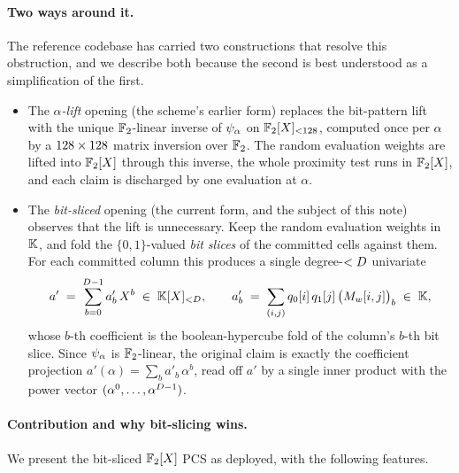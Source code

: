 \paragraph{Two ways around it.} The reference codebase has carried two
constructions that resolve this obstruction, and we describe both
because the second is best understood as a simplification of the first.

\begin{itemize}[leftmargin=2em]
  \item The \emph{$\alpha$-lift} opening (the scheme's earlier form)
    replaces the bit-pattern lift with the unique $\mathbb{F}_2$-linear inverse
    of $\psi_{\alpha}$ on $\mathbb{F}_2[X]_{<128}$, computed once per $\alpha$
    by a $128 \times 128$ matrix inversion over $\mathbb{F}_2$. The
    random evaluation weights are lifted into $\mathbb{F}_2[X]$ through this
    inverse, the whole proximity test runs in $\mathbb{F}_2[X]$, and each claim
    is discharged by one evaluation at $\alpha$.

  \item The \emph{bit-sliced} opening (the current form, and the subject
    of this note) observes that the lift is unnecessary. Keep the random
    evaluation weights in $\mathbb{K}$, and fold the $\{0,1\}$-valued
    \emph{bit slices} of the committed cells against them. For each
    committed column this produces a single degree-$<D$ univariate
    \[
      a' \;=\; \sum_{b=0}^{D-1} a'_b \, X^b \;\in\; \mathbb{K}[X]_{<D},
      \qquad
      a'_b \;=\; \sum_{(i,j)} q_0[i]\,q_1[j]\,\bigl(M_w[i,j]\bigr)_b \;\in\; \mathbb{K},
    \]
    whose $b$-th coefficient is the boolean-hypercube fold of the
    column's $b$-th bit slice. Since $\psi_{\alpha}$ is $\mathbb{F}_2$-linear, the
    original claim is exactly the coefficient projection
    $a'(\alpha) = \sum_b a'_b\,\alpha^b$, read off $a'$ by a single
    inner product with the power vector $(\alpha^0, \dots,
    \alpha^{D-1})$.
\end{itemize}

\paragraph{Contribution and why bit-slicing wins.} We present the
bit-sliced $\mathbb{F}_2[X]$ PCS as deployed, with the following features.

